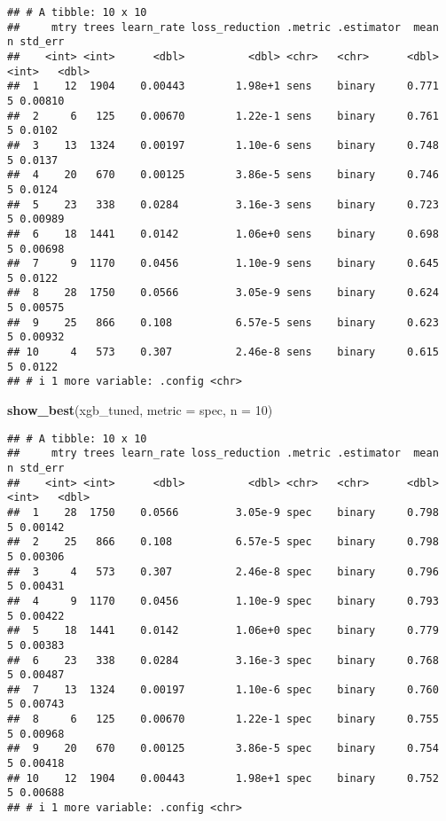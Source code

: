 \documentclass[
]{article}
\newenvironment{Shaded}{\begin{snugshade}}{\end{snugshade}}
\newcommand{\AttributeTok}[1]{\textcolor[rgb]{0.13,0.29,0.53}{#1}}
\newcommand{\DecValTok}[1]{\textcolor[rgb]{0.00,0.00,0.81}{#1}}
\newcommand{\FunctionTok}[1]{\textcolor[rgb]{0.13,0.29,0.53}{\textbf{#1}}}
\newcommand{\NormalTok}[1]{#1}
\newcommand{\StringTok}[1]{\textcolor[rgb]{0.31,0.60,0.02}{#1}}
\begin{document}
\begin{verbatim}
## # A tibble: 10 x 10
##     mtry trees learn_rate loss_reduction .metric .estimator  mean     n std_err
##    <int> <int>      <dbl>          <dbl> <chr>   <chr>      <dbl> <int>   <dbl>
##  1    12  1904    0.00443        1.98e+1 sens    binary     0.771     5 0.00810
##  2     6   125    0.00670        1.22e-1 sens    binary     0.761     5 0.0102 
##  3    13  1324    0.00197        1.10e-6 sens    binary     0.748     5 0.0137 
##  4    20   670    0.00125        3.86e-5 sens    binary     0.746     5 0.0124 
##  5    23   338    0.0284         3.16e-3 sens    binary     0.723     5 0.00989
##  6    18  1441    0.0142         1.06e+0 sens    binary     0.698     5 0.00698
##  7     9  1170    0.0456         1.10e-9 sens    binary     0.645     5 0.0122 
##  8    28  1750    0.0566         3.05e-9 sens    binary     0.624     5 0.00575
##  9    25   866    0.108          6.57e-5 sens    binary     0.623     5 0.00932
## 10     4   573    0.307          2.46e-8 sens    binary     0.615     5 0.0122 
## # i 1 more variable: .config <chr>
\end{verbatim}

\begin{Shaded}
\begin{Highlighting}[]
\FunctionTok{show\_best}\NormalTok{(xgb\_tuned, }\AttributeTok{metric =} \StringTok{\textquotesingle{}spec\textquotesingle{}}\NormalTok{, }\AttributeTok{n =} \DecValTok{10}\NormalTok{)}
\end{Highlighting}
\end{Shaded}

\begin{verbatim}
## # A tibble: 10 x 10
##     mtry trees learn_rate loss_reduction .metric .estimator  mean     n std_err
##    <int> <int>      <dbl>          <dbl> <chr>   <chr>      <dbl> <int>   <dbl>
##  1    28  1750    0.0566         3.05e-9 spec    binary     0.798     5 0.00142
##  2    25   866    0.108          6.57e-5 spec    binary     0.798     5 0.00306
##  3     4   573    0.307          2.46e-8 spec    binary     0.796     5 0.00431
##  4     9  1170    0.0456         1.10e-9 spec    binary     0.793     5 0.00422
##  5    18  1441    0.0142         1.06e+0 spec    binary     0.779     5 0.00383
##  6    23   338    0.0284         3.16e-3 spec    binary     0.768     5 0.00487
##  7    13  1324    0.00197        1.10e-6 spec    binary     0.760     5 0.00743
##  8     6   125    0.00670        1.22e-1 spec    binary     0.755     5 0.00968
##  9    20   670    0.00125        3.86e-5 spec    binary     0.754     5 0.00418
## 10    12  1904    0.00443        1.98e+1 spec    binary     0.752     5 0.00688
## # i 1 more variable: .config <chr>
\end{verbatim}
\end{document}
